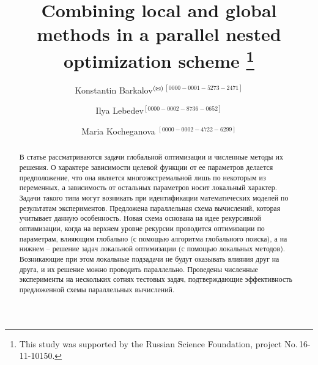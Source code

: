 \documentclass{svproc}
\def\orcidID#1{\unskip$^{[#1]}$}
\def\letter{$^{\textrm{(\Letter)}}$}
\begin{document}
\mainmatter              %
%
\title{ Combining local and global methods in a parallel nested optimization scheme 
\thanks{This study was supported by the Russian Science Foundation, project No.\,16-11-10150.}
}
%
%
\author{Konstantin Barkalov\letter\orcidID{0000-0001-5273-2471} \and Ilya Lebedev\orcidID{0000-0002-8736-0652} \and Maria Kocheganova \orcidID{0000-0002-4722-6299}}
%
%
%
	
\maketitle              %

\begin{abstract}

В статье рассматриваются задачи глобальной оптимизации и численные методы их решения. О характере зависимости целевой функции от ее параметров делается предположение, что она является многоэкстремальной лишь по некоторым из переменных, а зависимость от остальных параметров носит локальный характер. Задачи такого типа могут возникать при идентификации математических моделей по результатам экспериментов. Предложена параллельная схема вычислений, которая учитывает данную особенность. Новая схема основана на идее рекурсивной оптимизации, когда на верхнем уровне рекурсии проводится оптимизации по параметрам, влияющим глобально (с помощью алгоритма глобального поиска), а на нижнем -- решение задач локальной оптимизации (с помощью локальных методов). Возникающие при этом локальные подзадачи не будут оказывать влияния друг на друга, и их решение можно проводить параллельно. Проведены численные эксперименты на нескольких сотнях тестовых задач, подтверждающие эффективность предложенной схемы параллельных вычислений.


\end{abstract}
\end{document}

